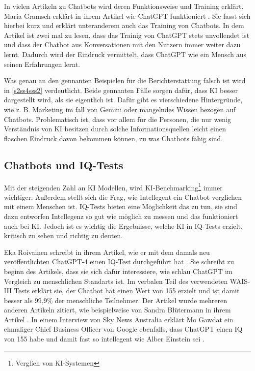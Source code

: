 	In vielen Artikeln zu Chatbots wird deren Funktionsweise und Training erklärt. Maria Gramsch erklärt in 
	ihrem Artikel wie ChatGPT funktioniert \cite{gramsch23}. Sie fasst sich hierbei kurz und erklärt unteranderem
	auch das Training von Chatbots. In dem Artikel ist zwei mal zu lesen, dass das Trainig von ChatGPT stets
	unvollendet ist und dass der Chatbot aus Konversationen mit den Nutzern immer weiter dazu lernt. Dadurch wird
	der Eindruck vermittelt, dass ChatGPT wie ein Mensch aus seinen Erfahrungen lernt.

	Was genau an den gennanten Beispielen für die Berichterstattung falsch ist wird in \ref{s2ss4sss2}
	verdeutlicht. Beide gennanten Fälle sorgen dafür, dass KI besser dargestellt wird, als sie eigentlich
	ist. Dafür gibt es vierschiedene Hintergründe, wie z. B. Marketing im fall von Gemini oder mangelndes
	Wissen bezogen auf Chatbots. Problematisch ist, dass vor allem für die Personen, die nur wenig Verständnis 
	von KI besitzen durch solche Informationsquellen leicht einen flaschen Eindruck davon bekommen können, zu
	was Chatbots fähig sind.	 	 
	
	
	\subsection{Chatbots und IQ-Tests}
	Mit der steigenden Zahl an KI Modellen, wird KI-Benchmarking\footnote{Verglich von KI-Systemen} immer wichtiger. 
	Außerdem stellt sich die Frag, wie Intellegent ein Chatbot verglichen mit einem Menschen ist. IQ-Tests 
	bieten eine Möglichkeit das zu tun, sie sind dazu entworfen Intellegenz so gut wie möglich zu messen und das 
	funktioniert auch bei KI. Jedoch ist es wichtig die Ergebnisse, welche KI in IQ-Tests erzielt, kritisch zu
	sehen und richtig zu deuten.

	Eka Roivainen schreibt in ihrem Artikel, wie er mit dem damals neu veröffentlichten ChatGPT-4 einen IQ-Test
	durchgeführt hat \cite{roivainen23}. Sie schreibt zu beginn des Artikels, dass sie sich dafür interessiere, wie
	schlau ChatGPT im Vergleich zu menschlichen Standarts ist. Im verbalen Teil des verwendeten WAIS-III Tests
	erklärt sie, der Chatbot hat einen Wert von 155 erzielt und ist damit besser als 99,9\% der menschliche Teilnehmer.
	Der Artikel wurde mehreren anderen Artikeln zitiert, wie beispielweise von Sandra Blütermann in ihrem Artikel
	\cite{blutermann23}. In einem Interview von Sky News Australia erklärt Mo Gawdat ein ehmaliger Chief Business
	Officer von Google ebenfalls, dass ChatGPT einen IQ von 155 habe und damit fast so intellegent wie Alber Einstein
	sei \cite{gawdat23}.

